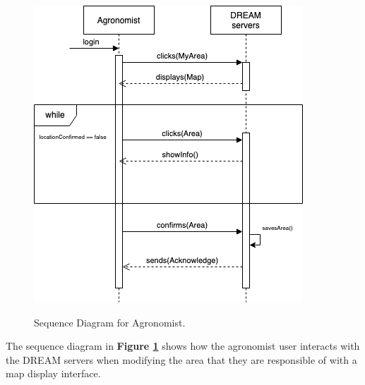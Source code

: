 \begin{figure}[hpt!]
\centering
\includegraphics[scale=0.6]{Files/sequence_disgrams/thePNGs/agronomist_choosingLocation.png}\\
\caption{\label{fig:agrSeqArea}Sequence Diagram for Agronomist.}
\end{figure}

\begin{flushleft}
The sequence diagram in \textbf{Figure \ref{fig:agrSeqArea}} shows how the agronomist user interacts with the DREAM servers when modifying the area that they are responsible of with a map display interface.
\end{flushleft}


